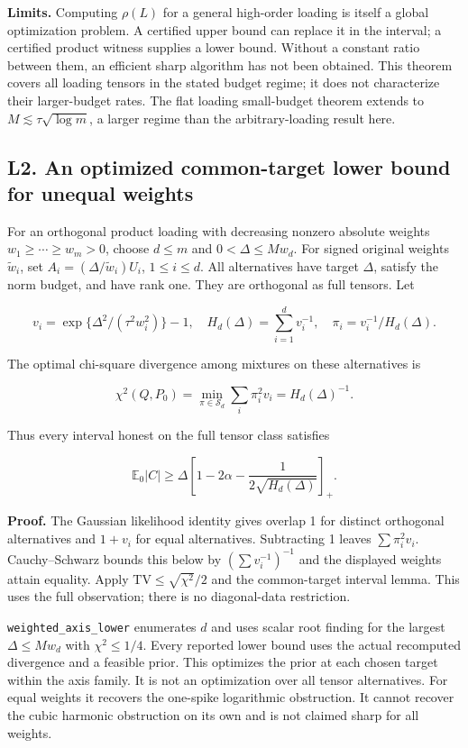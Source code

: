 \documentclass[
  10pt,
]{article}
\begin{document}
\textbf{Limits.} Computing \(\rho(L)\) for a general high-order loading
is itself a global optimization problem. A certified upper bound can
replace it in the interval; a certified product witness supplies a lower
bound. Without a constant ratio between them, an efficient sharp
algorithm has not been obtained. This theorem covers all loading tensors
in the stated budget regime; it does not characterize their
larger-budget rates. The flat loading small-budget theorem extends to
\(M\lesssim\tau\sqrt{\log m}\), a larger regime than the
arbitrary-loading result here.

\subsection{L2. An optimized common-target lower bound for unequal
weights}\label{l2.-an-optimized-common-target-lower-bound-for-unequal-weights}

For an orthogonal product loading with decreasing nonzero absolute
weights \(w_1\ge\cdots\ge w_m>0\), choose \(d\le m\) and
\(0<\Delta\le Mw_d\). For signed original weights \(\widetilde w_i\),
set \(A_i=(\Delta/\widetilde w_i)U_i\), \(1\le i\le d\). All
alternatives have target \(\Delta\), satisfy the norm budget, and have
rank one. They are orthogonal as full tensors. Let

\[v_i=\exp\{\Delta^2/(\tau^2w_i^2)\}-1,\quad
H_d(\Delta)=\sum_{i=1}^d v_i^{-1},\quad
\pi_i=v_i^{-1}/H_d(\Delta).\]

The optimal chi-square divergence among mixtures on these alternatives
is

\[\chi^2(Q,P_0)=\min_{\pi\in\mathcal S_d}\sum_i\pi_i^2v_i
=H_d(\Delta)^{-1}.\]

Thus every interval honest on the full tensor class satisfies

\[\mathbb E_0|C|\ge\Delta\left[1-2\alpha-
\frac{1}{2\sqrt{H_d(\Delta)}}\right]_+.\]

\textbf{Proof.} The Gaussian likelihood identity gives overlap 1 for
distinct orthogonal alternatives and \(1+v_i\) for equal alternatives.
Subtracting 1 leaves \(\sum\pi_i^2v_i\). Cauchy--Schwarz bounds this
below by \((\sum v_i^{-1})^{-1}\) and the displayed weights attain
equality. Apply \(\mathrm{TV}\le\sqrt{\chi^2}/2\) and the common-target
interval lemma. This uses the full observation; there is no
diagonal-data restriction.

\texttt{weighted\_axis\_lower} enumerates \(d\) and uses scalar root
finding for the largest \(\Delta\le Mw_d\) with \(\chi^2\le1/4\). Every
reported lower bound uses the actual recomputed divergence and a
feasible prior. This optimizes the prior at each chosen target within
the axis family. It is not an optimization over all tensor alternatives.
For equal weights it recovers the one-spike logarithmic obstruction. It
cannot recover the cubic harmonic obstruction on its own and is not
claimed sharp for all weights.
\end{document}
